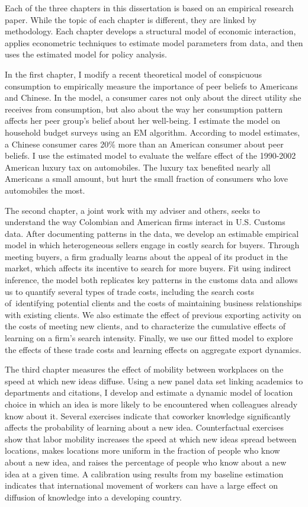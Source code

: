 
Each of the three chapters in this dissertation is based on an empirical research paper.  While the topic of each chapter is different, they are linked by methodology.  Each chapter develops a structural model of economic interaction, applies econometric techniques to estimate model parameters from data, and then uses the estimated model for policy analysis.

In the first chapter, I modify a recent theoretical model of conspicuous consumption to empirically measure the importance of peer beliefs to Americans and Chinese.  In the model, a consumer cares not only about the direct utility she receives from consumption, but also about the way her consumption pattern affects her peer group's belief about her well-being.  I estimate the model on household budget surveys using an EM algorithm. According to model estimates, a Chinese consumer cares 20\% more than an American consumer about peer beliefs.  I use the estimated model to evaluate the welfare effect of the 1990-2002 American luxury tax on automobiles.  The luxury tax benefited nearly all Americans a small amount, but hurt the small fraction of consumers who love automobiles the most.

The second chapter, a joint work with my adviser and others, seeks to understand the way Colombian and American firms interact in U.S. Customs data.  After documenting patterns in the data, we develop an estimable empirical model in which heterogeneous sellers engage in costly search for buyers.  Through meeting buyers, a firm gradually learns about the appeal of its product in the market, which affects its incentive to search for more buyers.  Fit using indirect inference, the model both replicates key patterns in the customs data and allows us to quantify several types of trade costs, including the search costs of\ identifying potential clients and the costs of maintaining business relationships with existing clients. We also estimate the effect of previous exporting activity on the costs of meeting new clients, and to characterize the cumulative effects of learning on a firm's search intensity. Finally, we use our fitted model to explore the effects of these trade costs and learning effects on aggregate export dynamics.

The third chapter measures the effect of mobility between workplaces on the speed at which new ideas diffuse.  Using a new panel data set linking academics to departments and citations, I develop and estimate a dynamic model of location choice in which an idea is more likely to be encountered when colleagues already know about it.  Several exercises indicate that coworker knowledge significantly affects the probability of learning about a new idea.  Counterfactual exercises show that labor mobility increases the speed at which new ideas spread between locations, makes locations more uniform in the fraction of people who know about a new idea, and raises the percentage of people who know about a new idea at a given time.  A calibration using results from my baseline estimation indicates that international movement of workers can have a large effect on diffusion of knowledge into a developing country.

